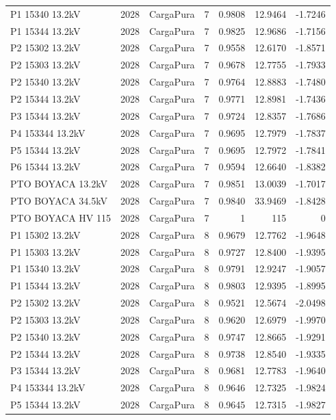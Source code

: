 \documentclass[11pt,a4paper]{article}
\begin{document}
\begin{longtable}{llllrrr}
P1 15340 13.2kV & 2028 & CargaPura & 7 & 0.9808 & 12.9464 & -1.7246 \\
P1 15344 13.2kV & 2028 & CargaPura & 7 & 0.9825 & 12.9686 & -1.7156 \\
P2 15302 13.2kV & 2028 & CargaPura & 7 & 0.9558 & 12.6170 & -1.8571 \\
P2 15303 13.2kV & 2028 & CargaPura & 7 & 0.9678 & 12.7755 & -1.7933 \\
P2 15340 13.2kV & 2028 & CargaPura & 7 & 0.9764 & 12.8883 & -1.7480 \\
P2 15344 13.2kV & 2028 & CargaPura & 7 & 0.9771 & 12.8981 & -1.7436 \\
P3 15344 13.2kV & 2028 & CargaPura & 7 & 0.9724 & 12.8357 & -1.7686 \\
P4 153344 13.2kV & 2028 & CargaPura & 7 & 0.9695 & 12.7979 & -1.7837 \\
P5 15344 13.2kV & 2028 & CargaPura & 7 & 0.9695 & 12.7972 & -1.7841 \\
P6 15344 13.2kV & 2028 & CargaPura & 7 & 0.9594 & 12.6640 & -1.8382 \\
PTO BOYACA 13.2kV & 2028 & CargaPura & 7 & 0.9851 & 13.0039 & -1.7017 \\
PTO BOYACA 34.5kV & 2028 & CargaPura & 7 & 0.9840 & 33.9469 & -1.8428 \\
PTO BOYACA HV 115 & 2028 & CargaPura & 7 & 1 & 115 & 0 \\
P1 15302 13.2kV & 2028 & CargaPura & 8 & 0.9679 & 12.7762 & -1.9648 \\
P1 15303 13.2kV & 2028 & CargaPura & 8 & 0.9727 & 12.8400 & -1.9395 \\
P1 15340 13.2kV & 2028 & CargaPura & 8 & 0.9791 & 12.9247 & -1.9057 \\
P1 15344 13.2kV & 2028 & CargaPura & 8 & 0.9803 & 12.9395 & -1.8995 \\
P2 15302 13.2kV & 2028 & CargaPura & 8 & 0.9521 & 12.5674 & -2.0498 \\
P2 15303 13.2kV & 2028 & CargaPura & 8 & 0.9620 & 12.6979 & -1.9970 \\
P2 15340 13.2kV & 2028 & CargaPura & 8 & 0.9747 & 12.8665 & -1.9291 \\
P2 15344 13.2kV & 2028 & CargaPura & 8 & 0.9738 & 12.8540 & -1.9335 \\
P3 15344 13.2kV & 2028 & CargaPura & 8 & 0.9681 & 12.7783 & -1.9640 \\
P4 153344 13.2kV & 2028 & CargaPura & 8 & 0.9646 & 12.7325 & -1.9824 \\
P5 15344 13.2kV & 2028 & CargaPura & 8 & 0.9645 & 12.7315 & -1.9827 \\

\end{longtable}
\end{document}
